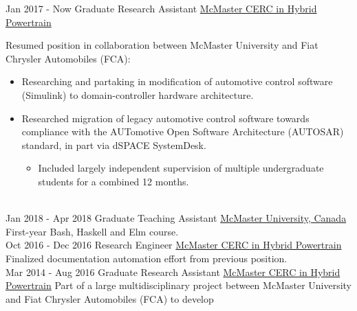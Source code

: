\documentclass[letterpaper]{twentysecondcv} %
\begin{document}
\vspace{-.5em}
\begin{twenty} %
  \twentyitem
  {Jan 2017 -}
  {Now}
  {Graduate Research Assistant}
  {%
    \href{http://hybrid.mcmaster.ca/}{McMaster CERC in Hybrid Powertrain}}
  {}
  {Resumed position in collaboration between McMaster University and Fiat Chrysler Automobiles (FCA):\begin{itemize}
      \item Researching and partaking in modification of automotive control software (Simulink) to domain-controller hardware architecture.
			\item Researched migration of legacy automotive control software towards compliance with the AUTomotive Open Software Architecture (AUTOSAR) standard, in part via dSPACE SystemDesk.
      \begin{itemize}
        \item Included largely independent supervision of multiple undergraduate students for a combined 12 months.
      \end{itemize}
	\end{itemize}}
	\\
  \twentyitem
  {Jan 2018 -}
  {Apr 2018}
  {Graduate Teaching Assistant}
  {\href{https://www.mcmaster.ca/}{McMaster University, Canada}}
  {}
  {First-year Bash, Haskell and Elm course.
}
  \\
	\twentyitem
	{Oct 2016 -}
	{Dec 2016}
	{Research Engineer}
	{\href{http://hybrid.mcmaster.ca/}{McMaster CERC in Hybrid Powertrain}}
	{}
	{Finalized documentation automation effort from previous position.
}
	\\
  \twentyitem
	{Mar 2014 -}
	{Aug 2016}
	{Graduate Research Assistant}
	{\href{http://hybrid.mcmaster.ca/}{McMaster CERC in Hybrid Powertrain}}
	{}
	{Part of a large multidisciplinary project
    between McMaster University and Fiat Chrysler Automobiles (FCA) to develop
}
\end{twenty}
\end{document}
